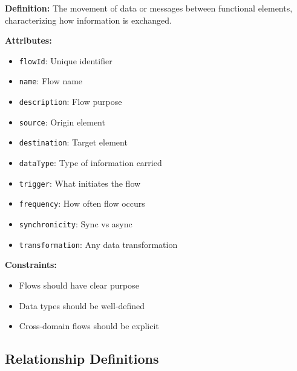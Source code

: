 \documentclass[11pt,letterpaper]{article}
\begin{document}
\begin{definitionbox}
\textbf{Definition:} The movement of data or messages between functional elements, characterizing how information is exchanged.

\textbf{Attributes:}
\begin{itemize}[nosep]
    \item \texttt{flowId}: Unique identifier
    \item \texttt{name}: Flow name
    \item \texttt{description}: Flow purpose
    \item \texttt{source}: Origin element
    \item \texttt{destination}: Target element
    \item \texttt{dataType}: Type of information carried
    \item \texttt{trigger}: What initiates the flow
    \item \texttt{frequency}: How often flow occurs
    \item \texttt{synchronicity}: Sync vs async
    \item \texttt{transformation}: Any data transformation
\end{itemize}

\textbf{Constraints:}
\begin{itemize}[nosep]
    \item Flows should have clear purpose
    \item Data types should be well-defined
    \item Cross-domain flows should be explicit
\end{itemize}
\end{definitionbox}

\subsection{Relationship Definitions}
\end{document}
